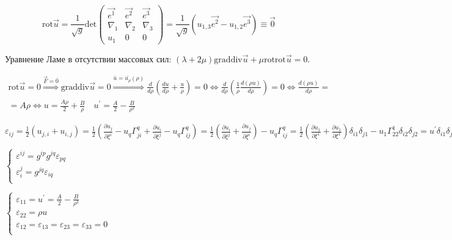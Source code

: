 $$
\mathrm{rot} \vec{u}=\frac{1}{\sqrt{g}} \mathrm{det}\left(\begin{array}{ccc}
\vec{e^1} & \vec{e^2} & \vec{e^3} \\
\nabla_1 & \nabla_2 & \nabla_3 \\
u_1 & 0 & 0
\end{array}\right)=\frac{1}{\sqrt{g}}\left(u_{1,3} \vec{e^2}-u_{1,2} \vec{e^3}\right) \equiv \overrightarrow{0}
$$

Уравнение Ламе в отсутствии массовых сил: $(\lambda+2 \mu) \mathrm{grad} \mathrm{div} \vec{u}+\mu \mathrm{rot} \mathrm{rot} \vec{u}=0$. 

$
\displaystyle
\begin{array}{l}

\mathrm{rot} \vec{u}=0 \stackrel{\vec{F}=\overline{0}}{\Rightarrow} \mathrm{grad} \mathrm{div} \vec{u}=0 \stackrel{\bar{u}={\bar{u_\rho}}(\rho)}{\Rightarrow} \frac{d}{d \rho}\left(\frac{d u}{d \rho}+\frac{u}{\rho}\right)=0 \Leftrightarrow \frac{d}{d \rho}\left(\frac{1}{\rho} \frac{d(\rho u)}{d \rho}\right)=0 \Leftrightarrow \frac{d(\rho u)}{d \rho}= \\ =A \rho \Leftrightarrow 
u=\frac{A \rho}{2}+\frac{B}{\rho} \quad u^{\prime}=\frac{A}{2}-\frac{B}{\rho^2}
\end{array}
$


$
\varepsilon_{i j} =\frac{1}{2}\left(u_{j, i}+u_{i, j}\right)=\frac{1}{2}(\frac{\partial u_j}{\partial \xi^i}-u_q \Gamma_{j i}^q+\frac{\partial u_i}{\partial \xi^j}-u_q \Gamma_{i j}^q)=\frac{1}{2}\left(\frac{\partial u_i}{\partial \xi^j}+\frac{\partial u_j}{\partial \xi^i}\right)-u_q \Gamma_{i j}^q= \frac{1}{2}\left(\frac{\partial u_1}{\partial \xi^1}+\frac{\partial u_1}{\partial \xi^1}\right) \delta_{i 1} \delta_{j 1}-u_1 \Gamma_{22}^1 \delta_{i 2} \delta_{j 2}=u^{\prime} \delta_{i 1} \delta_{j 1}+\rho u \delta_{i 2} \delta_{j 2}=\left(\frac{A \rho}{2}-\frac{B}{\rho^2}\right) \delta_{i 1} \delta_{j 1}+\left(\frac{A}{2} \rho^2+B\right) \delta_{i 2} \delta_{j 2}
$

$\left\{ \begin{array}{c}
    \varepsilon^{i j}=g^{i p} g^{j q} \varepsilon_{p q}\\
    \varepsilon_i^j=g^{j q} \varepsilon_{i q} \\
        \end{array}\right.
$ 

$\left\{ \begin{array}{c}
    \varepsilon_{11}=u^{\prime} =\frac{A}{2}-\frac{B}{\rho^2} \\
    \varepsilon_{22}=\rho u  \\
     \varepsilon_{12}=\varepsilon_{13}=\varepsilon_{23}=\varepsilon_{33}=0 \\
        \end{array}\right.
$

